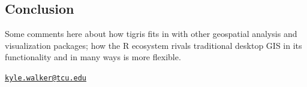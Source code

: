 \subsection{Conclusion}\label{conclusion}

Some comments here about how tigris fits in with other geospatial
analysis and visualization packages; how the R ecosystem rivals
traditional desktop GIS in its functionality and in many ways is more
flexible.



\address{%
Kyle Walker\\
Texas Christian University\\
2850 S University Dr\\ Fort Worth, TX 76109\\
}
\href{mailto:kyle.walker@tcu.edu}{\nolinkurl{kyle.walker@tcu.edu}}

\address{%
Bob Rudis\\
\\
\\ \\
}


